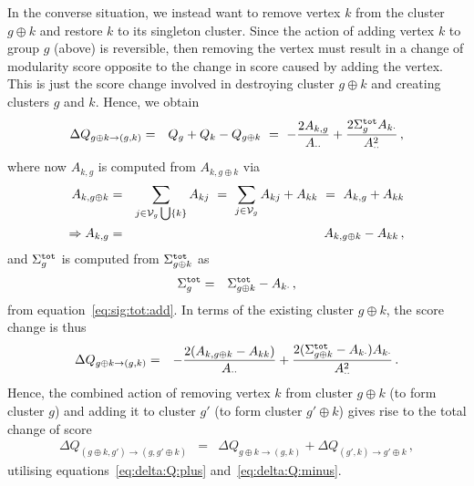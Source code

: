 \documentclass[a4paper]{article}
\begin{document}
In the converse situation, we instead want to remove vertex $k$ from the cluster $g\oplus k$
 and restore $k$ to its singleton cluster. Since the
action of adding vertex $k$ to group $g$ (above) is reversible, then removing the vertex must result in a change of 
modularity score opposite to the change in score caused by adding the vertex.
This is just the score change involved in destroying cluster $g\oplus k$ and creating clusters $g$ and $k$.
 Hence, we obtain
\begin{eqnarray}
    \Delta Q_{g\oplus k\rightarrow(g,k)} & = & Q_g+Q_k-Q_{g\oplus k}
~=~    -\frac{2A_{k,g}}{A_{\cdot\cdot}}+\frac{2\Sigma_g^{\tt tot}A_{k\cdot}}{A_{\cdot\cdot}^2}\,,
\end{eqnarray}
where now $A_{k,g}$ is computed from $A_{k,g\oplus k}$ via
\begin{eqnarray}
    A_{k,g\oplus k} & = & \sum_{j\in{\cal V}_g\bigcup\{k\}}A_{kj}
    ~=~\sum_{j\in{\cal V}_g}A_{kj}+A_{kk}~=~A_{k,g}+A_{kk}
\nonumber\\
\Rightarrow A_{k,g} & = & A_{k,g\oplus k} - A_{kk}\,,
\end{eqnarray}
and $\Sigma_g^{\tt tot}$ is computed from $\Sigma_{g\oplus k}^{\tt tot}$ as
\begin{eqnarray}
    \Sigma_{g}^{\tt tot} & = & \Sigma_{g\oplus k}^{\tt tot}-A_{k\cdot}\,,
\end{eqnarray}
from equation~\eqref{eq:sig:tot:add}.
In terms of the existing cluster $g\oplus k$, the score change is thus
\begin{eqnarray}
    \Delta Q_{g\oplus k\rightarrow(g,k)} & = &
    -\frac{2(A_{k,g\oplus k}-A_{kk})}{A_{\cdot\cdot}}
    +\frac{2(\Sigma_{g\oplus k}^{\tt tot}-A_{k\cdot})A_{k\cdot}}{A_{\cdot\cdot}^2}\,.
\label{eq:delta:Q:minus}
\end{eqnarray}
Hence, the combined action of removing vertex $k$ from cluster $g\oplus k$ (to form cluster $g$)
and adding it to cluster $g'$ (to form cluster $g'\oplus k$) gives rise to the total change of score
\begin{eqnarray}
    \Delta Q_{(g\oplus k,g')\rightarrow(g,g'\oplus k)} & = & \Delta Q_{g\oplus k\rightarrow(g,k)} + 
    \Delta Q_{(g',k)\rightarrow g'\oplus k}\,,
\end{eqnarray}
utilising equations~\eqref{eq:delta:Q:plus} and~\eqref{eq:delta:Q:minus}.
\end{document}
